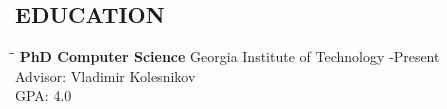 \documentclass{res}
\begin{document}

\address{%
  \bf ADDRESS\\%
  1101 Juniper St. NE\\%
  Atlanta, GA, 30309\\%
  Unit 211
}

\address{
  \bf CONTACT\\%
  (770) 361-6450\\%
  heath.davidanthony@gatech.edu\\%
  GTID: xx2703937
}

\begin{resume}

\section{EDUCATION}          
   \vspace{-0.1in}	
   \begin{tabbing}
   \hspace{2.3in}\= \hspace{2.6in}\= \kill %
    {\bf PhD Computer Science}
      \>Georgia Institute of Technology
      -Present \\
      \>Advisor: Vladimir Kolesnikov \\
      \>GPA: 4.0
   \end{tabbing}\vspace{-20pt}      %


\end{resume}
\end{document}
